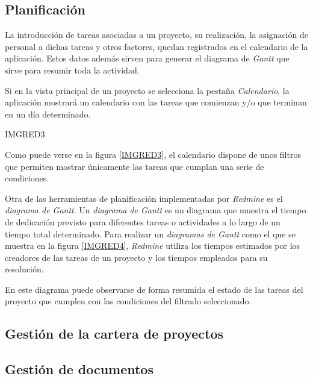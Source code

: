 \documentclass[11pt,a4paper,spanish,twoside]{report}
\begin{document}
	\subsection{Planificación}
	La introducción de tareas asociadas a un proyecto, su realización, la
	asignación de personal a dichas tareas y otros factores, quedan registrados
	en el calendario de la aplicación. Estos datos además sirven para generar
	el diagrama de \emph{Gantt} que sirve para resumir toda la actividad.

	Si en la vista principal de un proyecto se selecciona la pestaña
	\emph{Calendario}, la aplicación mostrará un calendario con las tareas
	que comienzan y/o que terminan en un día determinado.

	{IMGRED3}

	Como puede verse en la figura \ref{IMGRED3}, el calendario dispone de unos
	filtros que permiten mostrar únicamente	las tareas que cumplan una serie de
	condiciones.
	
	Otra de las herramientas de planificación implementadas por \emph{Redmine}
	es el \emph{diagrama de Gantt}. Un \emph{diagrama de Gantt} es un diagrama
	que muestra el tiempo de dedicación previsto para diferentes tareas o
	actividades a lo largo de un tiempo total determinado. Para realizar
	un \emph{diagramas de Gantt} como el que se muestra en la figura
	\ref{IMGRED4}, \emph{Redmine} utiliza los tiempos estimados por los
	creadores de las tareas de un proyecto y los tiempos	empleados para su
	resolución.


	En este diagrama puede observarse de forma resumida el estado de las tareas
	del proyecto que cumplen con las condiciones del filtrado seleccionado.

	\subsection{Gestión de la cartera de proyectos}


	\subsection{Gestión de documentos}
\end{document}
